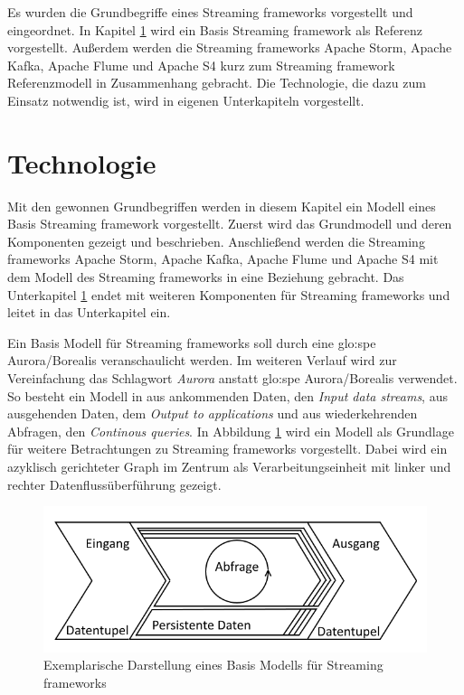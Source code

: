 Es wurden die Grundbegriffe eines Streaming frameworks vorgestellt und eingeordnet. In Kapitel \ref{section:technologie} wird ein Basis Streaming framework als Referenz vorgestellt. Außerdem werden die Streaming frameworks Apache Storm, Apache Kafka, Apache Flume und Apache S4 kurz zum Streaming framework Referenzmodell in Zusammenhang gebracht. Die Technologie, die dazu zum Einsatz notwendig ist, wird in eigenen Unterkapiteln vorgestellt.

\section{Technologie}
\label{section:technologie}

Mit den gewonnen Grundbegriffen werden in diesem Kapitel ein Modell eines Basis Streaming framework vorgestellt. Zuerst wird das Grundmodell und deren Komponenten gezeigt und beschrieben. Anschließend werden die Streaming frameworks Apache Storm, Apache Kafka, Apache Flume und Apache S4 mit dem Modell des Streaming frameworks in eine Beziehung gebracht. Das Unterkapitel \ref{section:technologie} endet mit weiteren Komponenten für Streaming frameworks und leitet in das Unterkapitel  ein.


Ein Basis Modell für Streaming frameworks soll durch eine \gls{glo:spe} Aurora/Borealis  veranschaulicht werden. Im weiteren Verlauf wird zur Vereinfachung das Schlagwort \textit{Aurora} anstatt \gls{glo:spe} Aurora/Borealis verwendet. So besteht ein Modell in  aus ankommenden Daten, den \textit{Input data streams}, aus ausgehenden Daten, dem \textit{Output to applications} und aus wiederkehrenden Abfragen, den \textit{Continous queries}. In Abbildung \ref{fig:basismodell} wird ein Modell als Grundlage für weitere Betrachtungen zu Streaming frameworks vorgestellt. Dabei wird ein azyklisch gerichteter Graph im Zentrum als Verarbeitungseinheit mit linker und rechter Datenflussüberführung gezeigt.

\begin{figure}[htb!]
\centering
\includegraphics[width=1.0\textwidth]{bilder/StreamingFrameworkBasisModell.png}
\caption{Exemplarische Darstellung eines Basis Modells für Streaming frameworks
\label{fig:basismodell}}
\end{figure}

